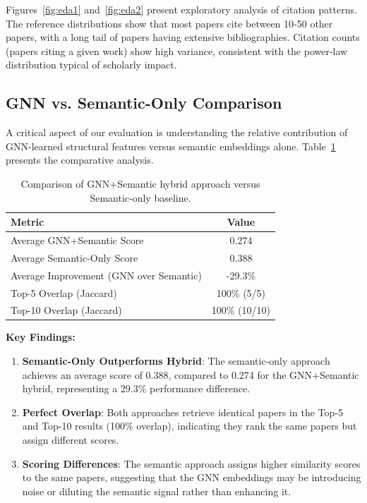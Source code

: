 \documentclass[pdflatex,sn-mathphys-num]{sn-jnl}
\theoremstyle{thmstyleone}%
\theoremstyle{thmstyletwo}%
\theoremstyle{thmstylethree}%
\begin{document}
Figures~\ref{fig:eda1} and~\ref{fig:eda2} present exploratory analysis of citation patterns. The reference distributions show that most papers cite between 10-50 other papers, with a long tail of papers having extensive bibliographies. Citation counts (papers citing a given work) show high variance, consistent with the power-law distribution typical of scholarly impact.

\subsection{GNN vs. Semantic-Only Comparison}

A critical aspect of our evaluation is understanding the relative contribution of GNN-learned structural features versus semantic embeddings alone. Table~\ref{tab:comparison} presents the comparative analysis.

\begin{table}[t]
\centering
\caption{Comparison of GNN+Semantic hybrid approach versus Semantic-only baseline.}
\label{tab:comparison}
\begin{tabular}{lc}
\toprule
\textbf{Metric} & \textbf{Value} \\
\midrule
Average GNN+Semantic Score & 0.274 \\
Average Semantic-Only Score & 0.388 \\
Average Improvement (GNN over Semantic) & -29.3\% \\
Top-5 Overlap (Jaccard) & 100\% (5/5) \\
Top-10 Overlap (Jaccard) & 100\% (10/10) \\
\bottomrule
\end{tabular}
\end{table}

\textbf{Key Findings:}

\begin{enumerate}
    \item \textbf{Semantic-Only Outperforms Hybrid}: The semantic-only approach achieves an average score of 0.388, compared to 0.274 for the GNN+Semantic hybrid, representing a 29.3\% performance difference.

    \item \textbf{Perfect Overlap}: Both approaches retrieve identical papers in the Top-5 and Top-10 results (100\% overlap), indicating they rank the same papers but assign different scores.

    \item \textbf{Scoring Differences}: The semantic approach assigns higher similarity scores to the same papers, suggesting that the GNN embeddings may be introducing noise or diluting the semantic signal rather than enhancing it.
\end{enumerate}
\end{document}
